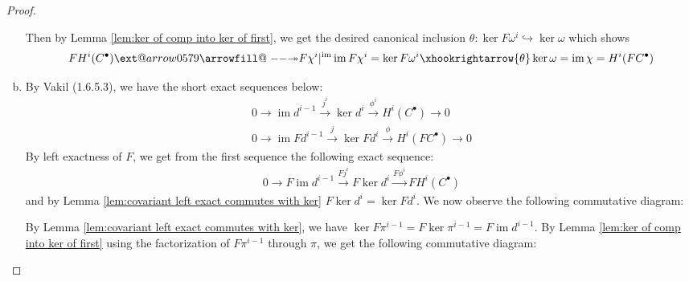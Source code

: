 \documentclass{article}
\makeatletter
\DeclareMathOperator{\im}{\mathrm{im}}
\DeclareMathOperator{\cok}{\mathrm{cok}}
\newcommand\xtwoheadrightarrow[2][]{%
  \ext@arrow 0579{\twoheadrightarrowfill@}{#1}{#2}}
\newcommand\twoheadrightarrowfill@{%
  \arrowfill@\relbar\relbar\twoheadrightarrow}
\makeatother
\begin{document}
\begin{proof}
\begin{enumerate}[(a)]
\begin{center}
   \end{center}
   Then by Lemma \ref{lem:ker of comp into ker of first}, we get the desired canonical inclusion $\theta:\ker F\omega^i \hookrightarrow \ker \omega$
    which shows
    \begin{align*}
        FH^i(C^\bullet)\xtwoheadrightarrow{F\chi^i\vert^{\im}} \im F\chi^i=\ker F\omega^i \xhookrightarrow{\theta} \ker \omega=\im \chi=H^i(FC^\bullet)
    \end{align*}
    \item 
    By Vakil (1.6.5.3), we have the short exact sequences below:
    \begin{align*}
        0\rightarrow \im d^{i-1}\xrightarrow{j^i} \ker d^i \xrightarrow{\phi^i} H^i(C^\bullet)\rightarrow0\\
        0\rightarrow \im Fd^{i-1}\xrightarrow{j} \ker Fd^i \xrightarrow{\phi} H^i(FC^\bullet)\rightarrow0
    \end{align*}
    By left exactness of $F$, we get from the first sequence the following exact sequence:
    \begin{align*}
        0\rightarrow F\im d^{i-1}\xrightarrow{Fj^i} F\ker d^i \xrightarrow{F\phi^i} FH^i(C^\bullet)
    \end{align*}
    and by Lemma \ref{lem:covariant left exact commutes with ker} $F\ker d^i=\ker Fd^i$. We now observe the following commutative diagram:
    \begin{center}
    \end{center}
    By Lemma \ref{lem:covariant left exact commutes with ker}, we have $\ker F\pi^{i-1}= F\ker \pi^{i-1}=F\im d^{i-1}$. By Lemma \ref{lem:ker of comp into ker of first} using the factorization of $F\pi^{i-1}$ through $\pi$, we get the following commutative diagram:
    \begin{center}
\end{center}
\end{enumerate}
\end{proof}
\end{document}
